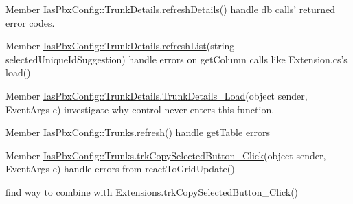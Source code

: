 \label{todo__todo000047}
\hypertarget{todo__todo000047}{}
 
\begin{DoxyDescription}
\item[Member \hyperlink{class_ias_pbx_config_1_1_trunk_details_aacce011c33fa9fed315eb27c9d9643ea}{IasPbxConfig::TrunkDetails.refreshDetails}() ]handle db calls' returned error codes. 
\end{DoxyDescription}

\label{todo__todo000046}
\hypertarget{todo__todo000046}{}
 
\begin{DoxyDescription}
\item[Member \hyperlink{class_ias_pbx_config_1_1_trunk_details_ab5c0db30702c3714191a3161c15bbbe5}{IasPbxConfig::TrunkDetails.refreshList}(string selectedUniqueIdSuggestion) ]handle errors on getColumn calls like Extension.cs's load() 
\end{DoxyDescription}

\label{todo__todo000049}
\hypertarget{todo__todo000049}{}
 
\begin{DoxyDescription}
\item[Member \hyperlink{class_ias_pbx_config_1_1_trunk_details_ab9b3bd0939b49cb616b15a7de3cb1d77}{IasPbxConfig::TrunkDetails.TrunkDetails\_\-Load}(object sender, EventArgs e) ]investigate why control never enters this function. 
\end{DoxyDescription}

\label{todo__todo000050}
\hypertarget{todo__todo000050}{}
 
\begin{DoxyDescription}
\item[Member \hyperlink{class_ias_pbx_config_1_1_trunks_a6499b1bd73dbd347476a9e2df5538691}{IasPbxConfig::Trunks.refresh}() ]handle getTable errors 
\end{DoxyDescription}

\label{todo__todo000053}
\hypertarget{todo__todo000053}{}
 
\begin{DoxyDescription}
\item[Member \hyperlink{class_ias_pbx_config_1_1_trunks_af34b4b2a4839c640dedb158ecd9b4756}{IasPbxConfig::Trunks.trkCopySelectedButton\_\-Click}(object sender, EventArgs e) ]handle errors from reactToGridUpdate() 

find way to combine with Extensions.trkCopySelectedButton\_\-Click() 
\end{DoxyDescription}

